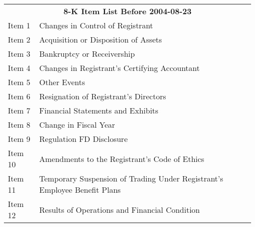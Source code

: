 
\begin{table}[H]
  \centering
    \begin{tabular}{ll}
    \multicolumn{2}{c}{\textbf{8-K Item List Before 2004-08-23}} \\
    Item 1 & Changes in Control of Registrant \\
    Item 2 & Acquisition or Disposition of Assets \\
    Item 3 & Bankruptcy or Receivership \\
    Item 4 & Changes in Registrant's Certifying Accountant \\
    Item 5 & Other Events \\
    Item 6 & Resignation of Registrant's Directors \\
    Item 7 & Financial Statements and Exhibits \\
    Item 8 & Change in Fiscal Year \\
    Item 9 & Regulation FD Disclosure \\
    Item 10 & Amendments to the Registrant's Code of Ethics \\
    Item 11 & Temporary Suspension of Trading Under Registrant's Employee Benefit Plans \\
    Item 12 & Results of Operations and Financial Condition \\
    \end{tabular}%
\end{table}%
\newpage
